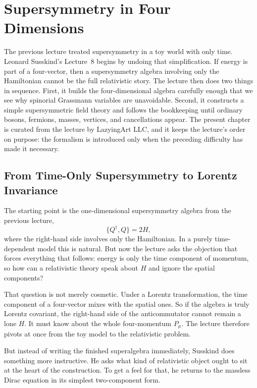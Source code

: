 \chapter{Supersymmetry in Four Dimensions}

The previous lecture treated supersymmetry in a toy world with only time. Leonard Susskind's Lecture~8 begins by undoing that simplification. If energy is part of a four-vector, then a supersymmetry algebra involving only the Hamiltonian cannot be the full relativistic story. The lecture then does two things in sequence. First, it builds the four-dimensional algebra carefully enough that we see why spinorial Grassmann variables are unavoidable. Second, it constructs a simple supersymmetric field theory and follows the bookkeeping until ordinary bosons, fermions, masses, vertices, and cancellations appear. The present chapter is curated from the lecture by LazyingArt LLC, and it keeps the lecture's order on purpose: the formalism is introduced only when the preceding difficulty has made it necessary.

\section{From Time-Only Supersymmetry to Lorentz Invariance}

The starting point is the one-dimensional supersymmetry algebra from the previous lecture,
\begin{equation}
\{Q^\dagger,Q\}=2H,
\end{equation}
where the right-hand side involves only the Hamiltonian. In a purely time-dependent model this is natural. But now the lecture asks the objection that forces everything that follows: energy is only the time component of momentum, so how can a relativistic theory speak about \(H\) and ignore the spatial components?

That question is not merely cosmetic. Under a Lorentz transformation, the time component of a four-vector mixes with the spatial ones. So if the algebra is truly Lorentz covariant, the right-hand side of the anticommutator cannot remain a lone \(H\). It must know about the whole four-momentum \(P_\mu\). The lecture therefore pivots at once from the toy model to the relativistic problem.

But instead of writing the finished superalgebra immediately, Susskind does something more instructive. He asks what kind of relativistic object ought to sit at the heart of the construction. To get a feel for that, he returns to the massless Dirac equation in its simplest two-component form.

